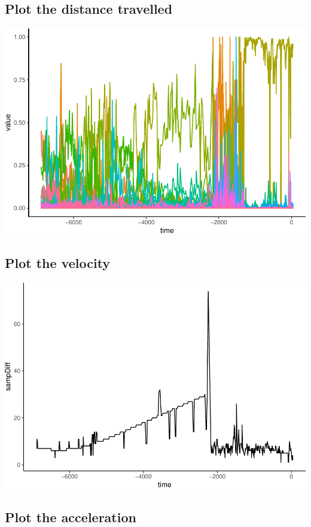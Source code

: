 \documentclass[12pt,twoside,openany]{reedthesis}
\begin{document}
\hypertarget{plot-the-distance-travelled}{%
\subsection{Plot the distance travelled}\label{plot-the-distance-travelled}}

\includegraphics{_myDissertation_files/figure-latex/unnamed-chunk-8-1.pdf}

\hypertarget{plot-the-velocity}{%
\subsection{Plot the velocity}\label{plot-the-velocity}}

\includegraphics{_myDissertation_files/figure-latex/unnamed-chunk-9-1.pdf}

\hypertarget{plot-the-acceleration}{%
\subsection{Plot the acceleration}\label{plot-the-acceleration}}
\end{document}
